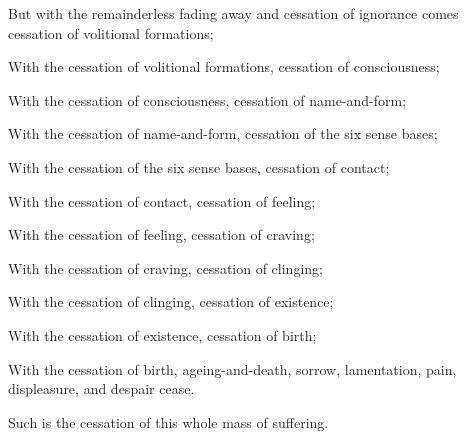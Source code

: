 \ifninebythirteen\clearpage\fi
\ifbfive\clearpage\fi


\begin{english-verses}
  \begin{english-hang-first-line}
    But with the remainderless fading away and cessation of ignorance comes cessation of volitional formations;
  \end{english-hang-first-line}
  \begin{english-hang-together-verses}
    With the cessation of volitional formations, cessation of consciousness;
  \end{english-hang-together-verses}
  \begin{english-hang-together-verses}
    With the cessation of consciousness, cessation of name-and-form;
  \end{english-hang-together-verses}
  \begin{english-hang-together-verses}
    With the cessation of name-and-form, cessation of the six sense bases;
  \end{english-hang-together-verses}
  \begin{english-hang-together-verses}
    With the cessation of the six sense bases, cessation of contact;
  \end{english-hang-together-verses}
  \begin{english-hang-together-verses}
    With the cessation of contact, cessation of feeling;
  \end{english-hang-together-verses}
  \begin{english-hang-together-verses}
    With the cessation of feeling, cessation of craving;
  \end{english-hang-together-verses}
  \begin{english-hang-together-verses}
    With the cessation of craving, cessation of clinging;
  \end{english-hang-together-verses}
  \begin{english-hang-together-verses}
    With the cessation of clinging, cessation of existence;
  \end{english-hang-together-verses}
  \begin{english-hang-together-verses}
    With the cessation of existence, cessation of birth;
  \end{english-hang-together-verses}
  \begin{english-hang-together-verses}
    With the cessation of birth, ageing-and-death, sorrow, lamentation, pain, displeasure, and despair cease.
  \end{english-hang-together-verses}
  \begin{english-hang-together-verses}
    Such is the cessation of this whole mass of suffering.
  \end{english-hang-together-verses}
\end{english-verses}

